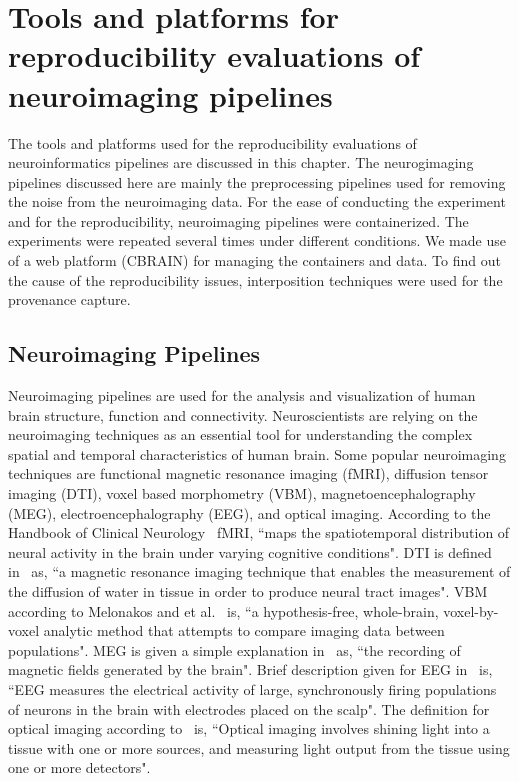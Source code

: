 \chapter{Tools and platforms for reproducibility evaluations of neuroimaging pipelines}\label{toolsandplatforms}

The tools and platforms used for the reproducibility evaluations of 
neuroinformatics pipelines are discussed in this chapter.
The 
neurogimaging pipelines discussed here are mainly the preprocessing 
pipelines used for removing the noise from the neuroimaging data. For 
the ease of conducting the experiment and for the reproducibility, 
neuroimaging pipelines were containerized. The experiments were 
repeated several times under different conditions. We made use of a web 
platform (CBRAIN) for managing the containers and data. To find out the 
cause of the reproducibility issues, interposition techniques were used 
for the provenance capture.

\section{Neuroimaging Pipelines}\label{neuroimaging}
Neuroimaging pipelines are used for the analysis and visualization of human brain structure, function and connectivity. Neuroscientists are relying on the neuroimaging techniques as an essential tool for understanding the complex spatial and temporal characteristics of human brain. Some popular neuroimaging techniques are functional magnetic resonance imaging (fMRI), diffusion tensor imaging (DTI), voxel based morphometry (VBM), magnetoencephalography (MEG), electroencephalography (EEG), and optical imaging. According  to the Handbook of Clinical Neurology~\cite{BUCHBINDER201661} fMRI, ``maps the spatiotemporal distribution of neural activity in the brain under varying cognitive conditions". DTI is defined in~\cite{Rizea11} as, ``a magnetic resonance imaging technique that enables the measurement of the diffusion of water in tissue in order to produce neural tract images". VBM according to Melonakos and et al.~\cite{MELONAKOS201165} is, ``a hypothesis-free, whole-brain, voxel-by-voxel analytic method that attempts to compare imaging data between populations". MEG is given a simple explanation in~\cite{Sato1985} as, ``the recording of magnetic fields generated by the brain". Brief description given for EEG in~\cite{Light2010} is, ``EEG measures the electrical activity of large, synchronously firing populations of neurons in the brain with electrodes placed on the scalp". The definition for optical imaging according to~\cite{doi:10.1080/23273798.2017.1290810} is, ``Optical imaging involves shining light into a tissue with one or more sources, and measuring light output from the tissue using one or more detectors".

